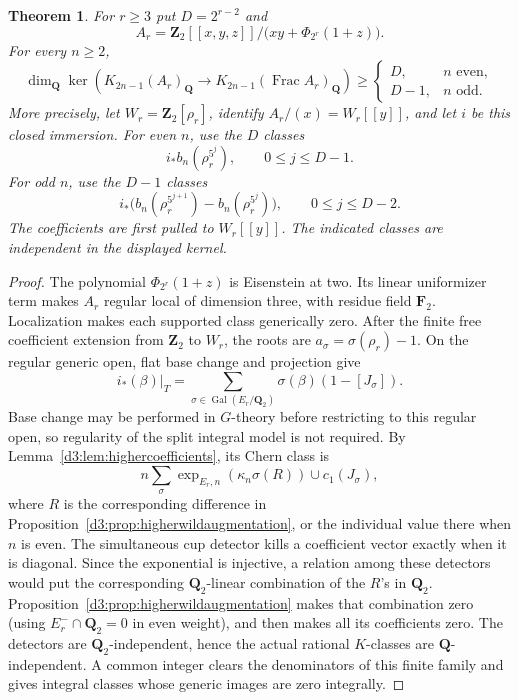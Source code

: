 \documentclass[11pt,a4paper]{amsart}
\numberwithin{equation}{section}
\newtheorem{theorem}{Theorem}[section]
\theoremstyle{definition}
\theoremstyle{remark}
\newcommand{\Q}{\mathbf Q}
\newcommand{\Z}{\mathbf Z}
\newcommand{\F}{\mathbf F}
\newcommand{\Frac}{\operatorname{Frac}}
\newcommand{\Gal}{\operatorname{Gal}}
\begin{document}
\begin{theorem}
\label{d3:thm:completedhigherodd}
For $r\geq3$ put $D=2^{r-2}$ and
\[
 A_r=\Z_2[[x,y,z]]/
 \bigl(xy+\Phi_{2^r}(1+z)\bigr).
\]
For every $n\geq2$,
\[
 \dim_{\Q}\ker\left(K_{2n-1}(A_r)_{\Q}
       \longrightarrow K_{2n-1}(\Frac A_r)_{\Q}\right)
 \geq
 \begin{cases}
 D,& n\text{ even},\\
 D-1,& n\text{ odd}.
 \end{cases}
\]
More precisely, let $W_r=\Z_2[\rho_r]$, identify
$A_r/(x)=W_r[[y]]$, and let $i$ be this closed immersion.
For even $n$, use the $D$ classes
\[
 i_*b_n(\rho_r^{5^j}),\qquad 0\leq j\leq D-1.
\]
For odd $n$, use the $D-1$ classes
\[
 i_*\bigl(b_n(\rho_r^{5^{j+1}})-b_n(\rho_r^{5^j})\bigr),
 \qquad 0\leq j\leq D-2.
\]
The coefficients are first pulled to $W_r[[y]]$.
The indicated classes are independent in the displayed kernel.
\end{theorem}
\begin{proof}
The polynomial $\Phi_{2^r}(1+z)$ is Eisenstein at two.
Its linear uniformizer term makes $A_r$ regular local of
dimension three, with residue field $\F_2$.
Localization makes each supported class generically zero.
After the finite free coefficient extension from $\Z_2$ to $W_r$,
the roots are $a_\sigma=\sigma(\rho_r)-1$.
On the regular generic open, flat base change and projection give
\[
 i_*(\beta)|_T
 =\sum_{\sigma\in\Gal(E_r/\Q_2)}
      \sigma(\beta)(1-[J_\sigma]).
\]
Base change may be performed in $G$-theory before restricting
to this regular open, so regularity of the split integral model
is not required. By Lemma~\ref{d3:lem:highercoefficients}, its Chern
class is
\[
 n\sum_\sigma
 \exp_{E_r,n}(\kappa_n\sigma(R))\cup c_1(J_\sigma),
\]
where $R$ is the corresponding difference in
Proposition~\ref{d3:prop:higherwildaugmentation}, or the individual
value there when $n$ is even.
The simultaneous cup detector kills a coefficient vector exactly
when it is diagonal. Since the exponential is injective, a
relation among these detectors would put the corresponding
$\Q_2$-linear combination of the $R$'s in $\Q_2$.
Proposition~\ref{d3:prop:higherwildaugmentation} makes that combination
zero (using $E_r^-\cap\Q_2=0$ in even weight), and then makes
all its coefficients zero.
The detectors are $\Q_2$-independent, hence the actual rational
$K$-classes are $\Q$-independent. A common integer clears the
denominators of this finite family and gives integral classes
whose generic images are zero integrally.
\end{proof}
\end{document}
